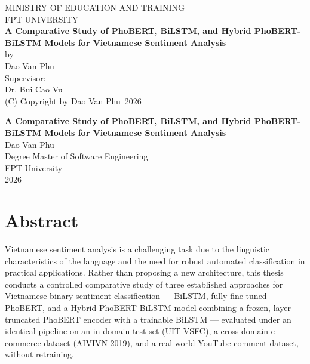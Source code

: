 \documentclass[12pt]{report} %
\newcommand{\thesistitle}{	
\textbf{A Comparative Study of PhoBERT, BiLSTM, and Hybrid PhoBERT-BiLSTM Models for Vietnamese Sentiment Analysis}}
\newcommand{\authorname}{Dao Van Phu}
\newcommand{\supervisor}{Dr. Bui Cao Vu}
\newcommand{\yearofconvocation}{2026}
\begin{document}
\begin{titlepage}
    \thispagestyle{empty}
    \begin{center}
        {\large MINISTRY OF EDUCATION AND TRAINING}\\
        {\large FPT UNIVERSITY}\\
        \vspace{2cm}
        {\LARGE \thesistitle}\\
        \vspace{1cm}
        by\\
        {\large \authorname}\\

        \vspace{1cm}
        Supervisor:\\
        \supervisor\\

        \vspace{2cm}
        (C) Copyright by \authorname\ \yearofconvocation\\
    \end{center}
\end{titlepage}

\cleardoublepage
{}
\begin{center}
    {\large \thesistitle}\\
    {\large \authorname}\\
    Degree Master of Software Engineering\\
    FPT University\\
    \yearofconvocation\\
    \vspace{1cm}
\end{center}

\section*{Abstract}
Vietnamese sentiment analysis is a challenging task due to the linguistic characteristics of the language and the need for robust automated classification in practical applications. Rather than proposing a new architecture, this thesis conducts a controlled comparative study of three established approaches for Vietnamese binary sentiment classification --- BiLSTM, fully fine-tuned PhoBERT, and a Hybrid PhoBERT-BiLSTM model combining a frozen, layer-truncated PhoBERT encoder with a trainable BiLSTM --- evaluated under an identical pipeline on an in-domain test set (UIT-VSFC), a cross-domain e-commerce dataset (AIVIVN-2019), and a real-world YouTube comment dataset, without retraining.
\end{document}
